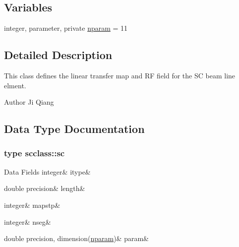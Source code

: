 \subsection*{Variables}
\begin{DoxyCompactItemize}
\item 
integer, parameter, private \mbox{\hyperlink{namespacescclass_a78eec9a89964d83818db291873df4436}{nparam}} = 11
\end{DoxyCompactItemize}


\subsection{Detailed Description}
This class defines the linear transfer map and RF field for the SC beam line elment. 

\begin{DoxyAuthor}{Author}
Ji Qiang 
\end{DoxyAuthor}


\subsection{Data Type Documentation}
\label{structscclass_1_1sc}
\subsubsection{type scclass\+::sc}
\begin{DoxyFields}{Data Fields}
\mbox{\label{namespacescclass_a4ddd6baf3b915cf7ff25830e84ce6e75}} 
integer&
itype&
\\
\hline

\mbox{\label{namespacescclass_ae9c1bce2c31838e6ec98bdbfe04cb6d7}} 
double precision&
length&
\\
\hline

\mbox{\label{namespacescclass_ac919c69cd2bb089386f56a5ac75728f0}} 
integer&
mapstp&
\\
\hline

\mbox{\label{namespacescclass_a32cf6178c767aecb2b10b7baa0221c78}} 
integer&
nseg&
\\
\hline

\mbox{\label{namespacescclass_a21e20d06bda8473fab959e3ee29e5183}} 
double precision, dimension(\mbox{\hyperlink{namespacescclass_a78eec9a89964d83818db291873df4436}{nparam}})&
param&
\\
\hline

\end{DoxyFields}


